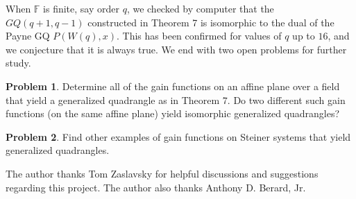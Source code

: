 \documentclass[11pt]{article}
\theoremstyle{definition}
\newtheorem{problem}{Problem}
\begin{document}
When $\mathbb{F}$ is finite, say order $q$, we checked by computer that the $GQ(q+1,q-1)$ constructed in Theorem 7 is isomorphic to the dual of the Payne GQ $P(W(q),x)$.  This has been confirmed for values of $q$ up to $16$, and we conjecture that it is always true.  We end with two open problems for further study.

\begin{problem}
Determine all of the gain functions on an affine plane over a field that yield a generalized quadrangle as in Theorem 7.  Do two different such gain functions (on the same affine plane) yield isomorphic generalized quadrangles?  
\end{problem}

\begin{problem}
Find other examples of gain functions on Steiner systems that yield generalized quadrangles.
\end{problem}

\bigskip{} The author thanks Tom Zaslavsky for helpful discussions and suggestions regarding this project.  The author also thanks Anthony D. Berard, Jr.



\end{document}
